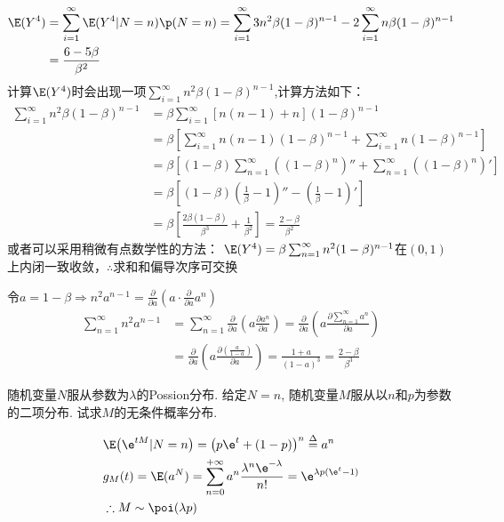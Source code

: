 \begin{solution}[2]
\[\begin{aligned}
			\E(Y^4)     & = \sum_{i=1}^{\infty}\E(Y^4|N=n)\p(N=n) = \sum_{i=1}^{\infty}3n^2\beta (1-\beta )^{n-1} - 2\sum_{i=1}^{\infty}n\beta (1-\beta )^{n-1}                                   \\
			            & = \frac{6-5\beta}{{\beta}^2}
		\end{aligned}\]
	计算$\E(Y^4)$时会出现一项$\sum_{i=1}^{\infty}n^2\beta (1-\beta )^{n-1}$,计算方法如下：
	\[\begin{aligned}
			\sum_{i=1}^{\infty}n^2\beta (1-\beta )^{n-1} & = \beta \sum_{i=1}^{\infty}[n(n-1)+n](1-\beta )^{n-1}                                                                        \\
			                                             & = \beta \left[\sum_{i=1}^{\infty}n(n-1)(1-\beta )^{n-1} + \sum_{i=1}^{\infty}n(1-\beta)^{n-1}\right]                         \\
			                                             & = \beta \left[(1-\beta )\sum_{n=1}^{\infty}\left((1-\beta )^n\right)'' + \sum_{n=1}^{\infty}\left((1-\beta)^n\right)'\right] \\
			                                             & = \beta \left[(1-\beta)\left(\frac{1}{\beta}-1\right)'' - \left(\frac{1}{\beta} - 1\right)'\right]                           \\
			                                             & = \beta \left[\frac{2\beta(1-\beta)}{\beta ^3} + \frac{1}{\beta ^2}\right] = \frac{2-\beta}{\beta ^2}
		\end{aligned}\]
	或者可以采用稍微有点数学性的方法：
	$\E(Y^4) = \beta \sum_{n=1}^{\infty}n^2 (1-\beta)^{n-1}$在$(0,1)$上内闭一致收敛，$\therefore$求和和偏导次序可交换

	令$a = 1-\beta \Rightarrow n^2 a^{n-1}=\frac{\partial }{\partial a}(a\cdot \frac{\partial }{\partial a}a^n)$
	\[\begin{aligned}
			\sum_{n=1}^{\infty}n^2 a^{n-1} & = \sum_{n=1}^{\infty}\frac{\partial }{\partial a}\left(a \frac{\partial a^n}{\partial a}\right) = \frac{\partial }{\partial a}\left(a \frac{\partial \sum_{n=1}^{\infty}a^n}{\partial a}\right) \\
			                               & = \frac{\partial }{\partial a}\left(a \frac{\partial (\frac{a}{1-a})}{\partial a}\right) = \frac{1+a}{(1-a)^3} = \frac{2-\beta}{\beta ^3}
		\end{aligned}\]
\end{solution}

\begin{problem}{1.17}
随机变量$N$服从参数为$\lambda$的Possion分布. 给定$N=n$, 随机变量$M$服从以$n$和$p$为参数的二项分布. 试求$M$的无条件概率分布.
\end{problem}
\begin{solution}
	\[
		\begin{split}
			& \E\big(\e^{tM}|N=n\big) = \big(p\e^t+(1-p)\big)^n \overset{\Delta}{=} a^n\\
			& g_M(t) = \E(a^N) = \sum^{+\infty}_{n=0}a^n\frac{\lambda^n \e^{-\lambda}}{n!} = \e^{\lambda p(\e^t-1)}\\
			& \therefore M \sim \poi(\lambda p)
		\end{split}
	\]
\end{solution}